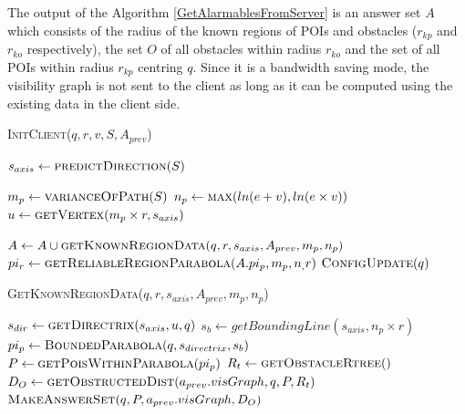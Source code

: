 The output of the Algorithm \ref{GetAlarmablesFromServer} is an answer set $A$ which consists of the radius of the known regions of POIs and obstacles ($r_{kp}$ and $r_{ko}$ respectively), the set $O$ of all obstacles within radius $r_{ko}$ and the set of all POIs within radius $r_{kp}$ centring $q$. Since it is a bandwidth saving mode, the visibility graph is not sent to the client as long as it can be computed using the existing data in the client side.\\

\begin{algorithm}
\caption{\textsc{InitClient}($q, r, v, S, A_{prev}$)}
\label{InitClient}


   
    
	 $s_{axis} \gets \textsc{predictDirection}(S)$ \;
	
	 $m_p \gets \textsc{varianceOfPath}(S)$ \;
	 $n_p \gets \textsc{max}( ln( e + v ),ln(e\times v))$ \;
	 $u \gets \textsc{getVertex}(m_p \times r, s_{axis})$ \;
	
	
	 $A \gets A \cup \textsc{getKnownRegionData}(q, r, s_{axis}, A_{prev}, m_p, n_p)$ \;
	 $pi_r \gets \textsc{getReliableRegionParabola}(A.pi_p,m_p,n_,r)$ \;
	$ \textsc{ConfigUpdate}(q)$\;
	 

\end{algorithm}
\vspace{5pt}
\begin{algorithm}
\caption{\textsc{GetKnownRegionData}($q, r, s_{axis}, A_{prev}, m_p, n_p$)}
\label{getKnownRegionData}

$s_{dir} \gets \textsc{getDirectrix}(s_{axis},u,q)$\;
$s_b \gets getBoundingLine(s_{axis},n_p \times r) $\;
$pi_p \gets \textsc{BoundedParabola}( q, s_{directrix},  s_b)$\;
$P \gets \textsc{getPoisWithinParabola}( pi_p )$\;
  $ R_t \gets \textsc{getObstacleRtree}()$\;
  $ D_O \gets \textsc{getObstructedDist}(a_{prev}.visGraph, q, P, R_t) $\;
\Return $\textsc{MakeAnswerSet}(q, P, a_{prev}.visGraph, D_O )  $
\end{algorithm}
